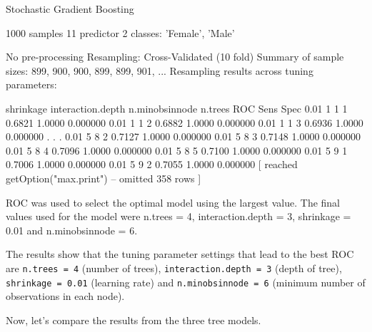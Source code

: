 \documentclass[12pt,]{krantz}
\makeatletter
\newenvironment{Shaded}{\begin{snugshade}}{\end{snugshade}}
\newcommand{\DataTypeTok}[1]{\textcolor[rgb]{0.27,0.27,0.27}{#1}}
\newcommand{\KeywordTok}[1]{\textcolor[rgb]{0.27,0.27,0.27}{\textbf{#1}}}
\newcommand{\NormalTok}[1]{#1}
\newcommand{\OperatorTok}[1]{\textcolor[rgb]{0.43,0.43,0.43}{\textbf{#1}}}
\newcommand{\StringTok}[1]{\textcolor[rgb]{0.5,0.5,0.5}{#1}}
\newenvironment{kframe}{%
\medskip{}
\setlength{\fboxsep}{.8em}
 \def\at@end@of@kframe{}%
 \ifinner\ifhmode%
  \def\at@end@of@kframe{\end{minipage}}%
  \begin{minipage}{\columnwidth}%
 \fi\fi%
 \def\FrameCommand##1{\hskip\@totalleftmargin \hskip-\fboxsep
 \colorbox{shadecolor}{##1}\hskip-\fboxsep
     \hskip-\linewidth \hskip-\@totalleftmargin \hskip\columnwidth}%
 \MakeFramed {\advance\hsize-\width
   \@totalleftmargin\z@ \linewidth\hsize
   \@setminipage}}%
 {\par\unskip\endMakeFramed%
 \at@end@of@kframe}
\renewenvironment{Shaded}{\begin{kframe}}{\end{kframe}}
\makeatother
\begin{document}
\begin{Shaded}
\begin{Highlighting}[]
\NormalTok{Stochastic Gradient Boosting }

\NormalTok{1000 samples}
\NormalTok{  11 predictor}
\NormalTok{   2 classes: 'Female', 'Male' }

\NormalTok{No pre-processing}
\NormalTok{Resampling: Cross-Validated (10 fold) }
\NormalTok{Summary of sample sizes: 899, 900, 900, 899, 899, 901, ... }
\NormalTok{Resampling results across tuning parameters:}

\NormalTok{  shrinkage  interaction.depth  n.minobsinnode  n.trees  ROC     Sens    Spec    }
\NormalTok{  0.01       1                   1              1        0.6821  1.0000  0.000000}
\NormalTok{  0.01       1                   1              2        0.6882  1.0000  0.000000}
\NormalTok{  0.01       1                   1              3        0.6936  1.0000  0.000000}
\NormalTok{  .}
\NormalTok{  .}
\NormalTok{  .}
\NormalTok{  0.01       5                   8              2        0.7127  1.0000  0.000000}
\NormalTok{  0.01       5                   8              3        0.7148  1.0000  0.000000}
\NormalTok{  0.01       5                   8              4        0.7096  1.0000  0.000000}
\NormalTok{  0.01       5                   8              5        0.7100  1.0000  0.000000}
\NormalTok{  0.01       5                   9              1        0.7006  1.0000  0.000000}
\NormalTok{  0.01       5                   9              2        0.7055  1.0000  0.000000}
\NormalTok{ [ reached getOption("max.print") -- omitted 358 rows ]}

\NormalTok{ROC was used to select the optimal model using the largest value.}
\NormalTok{The final values used for the model were n.trees = 4, interaction.depth = 3, shrinkage}
\NormalTok{ = 0.01 and n.minobsinnode = 6.}
\end{Highlighting}
\end{Shaded}

The results show that the tuning parameter settings that lead to the best ROC are \texttt{n.trees\ =\ 4} (number of trees), \texttt{interaction.depth\ =\ 3} (depth of tree), \texttt{shrinkage\ =\ 0.01} (learning rate) and \texttt{n.minobsinnode\ =\ 6} (minimum number of observations in each node).

Now, let's compare the results from the three tree models.

\begin{Shaded}
\end{Shaded}
\end{document}
